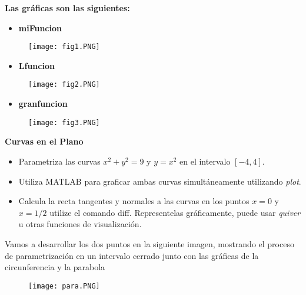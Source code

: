 \documentclass[letterpaper]{article}
\begin{document}
\vspace{\baselineskip}
\newpage
\begin{justify}
    \textbf{Las gráficas son las siguientes:}
\end{justify}

\begin{itemize}
    \item \textbf{miFuncion}
\end{itemize}
\begin{figure}[H]
    \centering
    \texttt{[image: fig1.PNG]}        
\end{figure}
\begin{itemize}
    \item \textbf{Lfuncion}
\end{itemize}
\begin{figure}[H]
    \centering
    \texttt{[image: fig2.PNG]}        
\end{figure}

\vspace{\baselineskip}

\begin{itemize}
    \item \textbf{granfuncion}
\end{itemize}
\begin{figure}[H]
    \centering
    \texttt{[image: fig3.PNG]}        
\end{figure}

\vspace{\baselineskip}


\textbf{Curvas en el Plano}
\begin{itemize}
    \item Parametriza las curvas \( x^2+y^2=9 \) y \( y= x^2 \) en el intervalo \( [-4,4] \).
    \item Utiliza MATLAB para graficar ambas curvas simultáneamente utilizando
    \textit{plot}.
    \item Calcula la recta tangentes y normales a las curvas en los puntos \( x = 0\) y \( x = 1/2 \) utilize el comando diff. Representelas gráficamente, puede usar
    \textit{quiver} u otras funciones de visualización.
\end{itemize}

\vspace{\baselineskip}
\newpage
\begin{justify}
    Vamos a desarrollar los dos puntos en la siguiente imagen, mostrando el proceso de parametrización en un intervalo cerrado junto con las gráficas de la circunferencia y la parabola
\end{justify}
\begin{figure}[H]
    \centering
    \texttt{[image: para.PNG]}        
\end{figure}
\vspace{\baselineskip}
\end{document}
